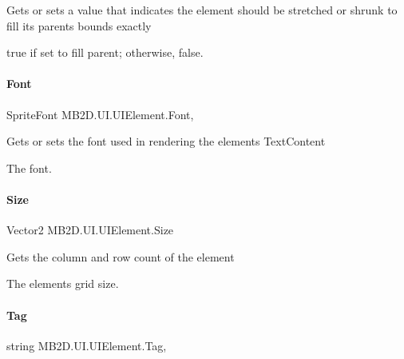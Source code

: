 Gets or sets a value that indicates the element should be stretched or shrunk to fill its parents bounds exactly 

{\ttfamily true} if set to fill parent; otherwise, {\ttfamily false}.\hypertarget{class_m_b2_d_1_1_u_i_1_1_u_i_element_a4c6bdbe83ece72ab6434c439371a0a39}{}\label{class_m_b2_d_1_1_u_i_1_1_u_i_element_a4c6bdbe83ece72ab6434c439371a0a39} 
\paragraph{\texorpdfstring{Font}{Font}}
{\footnotesize\ttfamily Sprite\+Font M\+B2\+D.\+U\+I.\+U\+I\+Element.\+Font\hspace{0.3cm}{\ttfamily [get]}, {\ttfamily [set]}}



Gets or sets the font used in rendering the elements Text\+Content 

The font.\hypertarget{class_m_b2_d_1_1_u_i_1_1_u_i_element_a0de3ac5ae7a1377b62677a9aeae8955e}{}\label{class_m_b2_d_1_1_u_i_1_1_u_i_element_a0de3ac5ae7a1377b62677a9aeae8955e} 
\paragraph{\texorpdfstring{Size}{Size}}
{\footnotesize\ttfamily Vector2 M\+B2\+D.\+U\+I.\+U\+I\+Element.\+Size\hspace{0.3cm}{\ttfamily [get]}}



Gets the column and row count of the element 

The elements grid size.\hypertarget{class_m_b2_d_1_1_u_i_1_1_u_i_element_a6cb084698047528460e9c56690307f2c}{}\label{class_m_b2_d_1_1_u_i_1_1_u_i_element_a6cb084698047528460e9c56690307f2c} 
\paragraph{\texorpdfstring{Tag}{Tag}}
{\footnotesize\ttfamily string M\+B2\+D.\+U\+I.\+U\+I\+Element.\+Tag\hspace{0.3cm}{\ttfamily [get]}, {\ttfamily [set]}}



